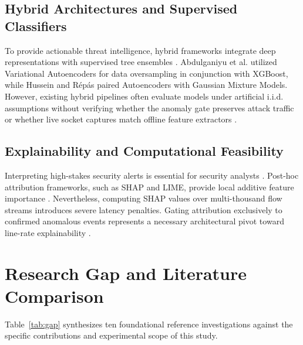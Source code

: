 \documentclass[journal]{IEEEtran}
\begin{document}
\subsection{Hybrid Architectures and Supervised Classifiers}
To provide actionable threat intelligence, hybrid frameworks integrate deep representations with supervised tree ensembles \cite{sajid2024,shirley2025,vinayaka2025}. Abdulganiyu et al. \cite{abdulganiyu2024} utilized Variational Autoencoders for data oversampling in conjunction with XGBoost, while Hussein and R\'ep\'as \cite{hussein2026} paired Autoencoders with Gaussian Mixture Models. However, existing hybrid pipelines often evaluate models under artificial i.i.d. assumptions without verifying whether the anomaly gate preserves attack traffic or whether live socket captures match offline feature extractors \cite{arcos2025,amin2025}.

\subsection{Explainability and Computational Feasibility}
Interpreting high-stakes security alerts is essential for security analysts \cite{neupane2022,ghosh2026}. Post-hoc attribution frameworks, such as SHAP and LIME, provide local additive feature importance \cite{benncir2024,mahmoud2025}. Nevertheless, computing SHAP values over multi-thousand flow streams introduces severe latency penalties. Gating attribution exclusively to confirmed anomalous events represents a necessary architectural pivot toward line-rate explainability \cite{mahmoud2025,vinayaka2025}.

\section{Research Gap and Literature Comparison}
Table~\ref{tab:gap} synthesizes ten foundational reference investigations against the specific contributions and experimental scope of this study.
\end{document}
